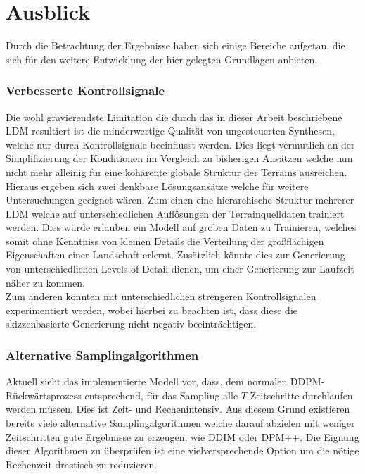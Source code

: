 \section{Ausblick}

Durch die Betrachtung der Ergebnisse haben sich einige Bereiche aufgetan, die sich für den weitere Entwicklung der hier gelegten Grundlagen anbieten.  

\subsubsection{Verbesserte Kontrollsignale}

Die wohl gravierendste Limitation die durch das in dieser Arbeit beschriebene \ac{LDM} resultiert ist die minderwertige Qualität von ungesteuerten Synthesen, welche nur durch Kontrollsignale beeinflusst werden. Dies liegt vermutlich an der Simplifizierung der Konditionen im Vergleich zu bisherigen Ansätzen welche nun nicht mehr alleinig für eine kohärente globale Struktur der Terrains ausreichen. \\
Hieraus ergeben sich zwei denkbare Lösungsansätze welche für weitere Untersuchungen geeignet wären. Zum einen eine hierarchische Struktur mehrerer \ac{LDM} welche auf unterschiedlichen Auflösungen der Terrainquelldaten trainiert werden. Dies würde erlauben ein Modell auf groben Daten zu Trainieren, welches somit ohne Kenntniss von kleinen Details die Verteilung der großflächigen Eigenschaften einer Landschaft erlernt. Zusätzlich könnte dies zur Generierung von unterschiedlichen Levels of Detail dienen, um einer Generierung zur Laufzeit näher zu kommen.\\
Zum anderen könnten mit unterschiedlichen strengeren Kontrollsignalen experimentiert werden, wobei hierbei zu beachten ist, dass diese die skizzenbasierte Generierung nicht negativ beeinträchtigen.  

\subsubsection{Alternative Samplingalgorithmen}

Aktuell sieht das implementierte Modell vor, dass, dem normalen DDPM-Rückwärtsprozess entsprechend, für das Sampling alle $T$ Zeitschritte durchlaufen werden müssen. Dies ist Zeit- und Rechenintensiv. Aus diesem Grund existieren bereits viele alternative Samplingalgorithmen welche darauf abzielen mit weniger Zeitschritten gute Ergebnisse zu erzeugen, wie DDIM oder DPM++. Die Eignung dieser Algorithmen zu überprüfen ist eine vielversprechende Option um die nötige Rechenzeit drastisch zu reduzieren.

